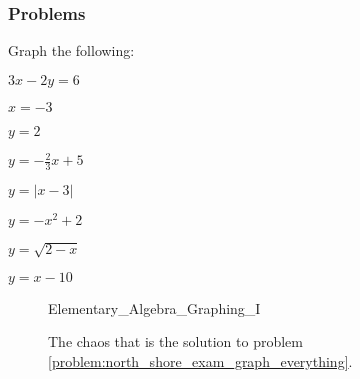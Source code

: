 \documentclass[crop=false,class=book,oneside]{standalone}
\begin{document}
        \subsubsection{Problems}
        \begin{problem}
        \label{problem:north_shore_exam_graph_everything}Graph the following:
        \begin{enumerate}
        \begin{multicols}{4}
            \item $3x-2y=6$
            \item $x=-3$
            \item $y=2$
            \item $y=-\frac{2}{3}x+5$
            \item $y=|x-3|$
            \item $y=-x^2+2$
            \item $y=\sqrt{2-x}$
            \item $y=x-10$
        \end{multicols}
        \end{enumerate}
        \end{problem}
        \begin{figure}[H]
            \centering
            \captionsetup{type=figure}
            {Elementary_Algebra_Graphing_I}
            \caption{The chaos that is the solution to problem
                     \ref{problem:north_shore_exam_graph_everything}.}
            \label{fig:north_shore_graphing_problem}
        \end{figure}
\end{document}
